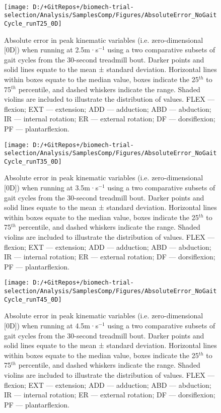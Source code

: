 \documentclass[]{elsarticle} %
\begin{document}
~

\begin{figure}

{\centering \texttt{[image: D:/+GitRepos+/biomech-trial-selection/Analysis/SamplesComp/Figures/AbsoluteError\_NoGaitCycle\_runT25\_0D]} 

}

\caption{Absolute error in peak kinematic variables (i.e. zero-dimensional [0D]) when running at 2.5m·s$^{-1}$ using a two comparative subsets of gait cycles from the 30-second treadmill bout. Darker points and solid lines equate to the mean ± standard deviation. Horizontal lines within boxes equate to the median value, boxes indicate the 25$^{th}$ to 75$^{th}$ percentile, and dashed whiskers indicate the range. Shaded violins are included to illustrate the distribution of values. FLEX — flexion; EXT — extension; ADD — adduction; ABD — abduction; IR — internal rotation; ER — external rotation; DF — dorsiflexion; PF — plantarflexion.}\label{fig:samplesComp_runT25_0D}
\end{figure}

\begin{figure}

{\centering \texttt{[image: D:/+GitRepos+/biomech-trial-selection/Analysis/SamplesComp/Figures/AbsoluteError\_NoGaitCycle\_runT35\_0D]} 

}

\caption{Absolute error in peak kinematic variables (i.e. zero-dimensional [0D]) when running at 3.5m·s$^{-1}$ using a two comparative subsets of gait cycles from the 30-second treadmill bout. Darker points and solid lines equate to the mean ± standard deviation. Horizontal lines within boxes equate to the median value, boxes indicate the 25$^{th}$ to 75$^{th}$ percentile, and dashed whiskers indicate the range. Shaded violins are included to illustrate the distribution of values. FLEX — flexion; EXT — extension; ADD — adduction; ABD — abduction; IR — internal rotation; ER — external rotation; DF — dorsiflexion; PF — plantarflexion.}\label{fig:samplesComp_runT35_0D}
\end{figure}

\begin{figure}

{\centering \texttt{[image: D:/+GitRepos+/biomech-trial-selection/Analysis/SamplesComp/Figures/AbsoluteError\_NoGaitCycle\_runT45\_0D]} 

}

\caption{Absolute error in peak kinematic variables (i.e. zero-dimensional [0D]) when running at 4.5m·s$^{-1}$ using a two comparative subsets of gait cycles from the 30-second treadmill bout. Darker points and solid lines equate to the mean ± standard deviation. Horizontal lines within boxes equate to the median value, boxes indicate the 25$^{th}$ to 75$^{th}$ percentile, and dashed whiskers indicate the range. Shaded violins are included to illustrate the distribution of values. FLEX — flexion; EXT — extension; ADD — adduction; ABD — abduction; IR — internal rotation; ER — external rotation; DF — dorsiflexion; PF — plantarflexion.}\label{fig:samplesComp_runT45_0D}
\end{figure}
\end{document}
